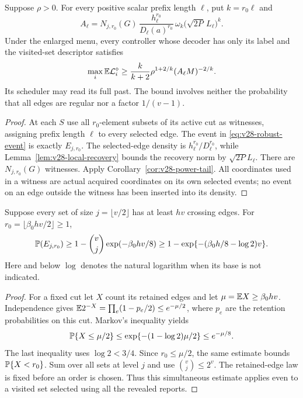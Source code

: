 \begin{proposition}
\label{prop:v28-explicit-tail}
Suppose $\rho>0$. For every positive scalar prefix length $\ell$,
put $k=r_0\ell$ and
\begin{equation}\label{eq:v28-tail-coefficient}
 A_\ell=N_{j,r_0}(G)\,
       \frac{h_\ell^{r_0}}{D_\ell(a)^{r_0}}\,
       \omega_k\bigl(\sqrt{2P}\,L_\ell\bigr)^k.
\end{equation}
Under the enlarged menu, every controller whose decoder has only its
label and the visited-set descriptor satisfies
\begin{equation}\label{eq:v28-explicit-tail}
 \max_i\mathbb E\mathcal L_i^\diamond
       \ge\frac{k}{k+2}\rho^{1+2/k}(A_\ell M)^{-2/k}.
\end{equation}
Its scheduler may read its full past. The bound involves neither the
probability that all edges are regular nor a factor $1/(v-1)$.
\end{proposition}
\begin{proof}
At each $S$ use all $r_0$-element subsets of its active cut as witnesses,
assigning prefix length $\ell$ to every selected edge. The event in
\eqref{eq:v28-robust-event} is exactly $E_{j,r_0}$. The selected-edge
density is $h_\ell^{r_0}/D_\ell^{r_0}$, while
Lemma~\ref{lem:v28-local-recovery} bounds the recovery norm by
$\sqrt{2P}L_\ell$. There are $N_{j,r_0}(G)$ witnesses. Apply
Corollary~\ref{cor:v28-power-tail}. All coordinates used in a witness
are actual acquired coordinates on its own selected events; no event
on an edge outside the witness has been inserted into its density.
\end{proof}

\begin{lemma}\label{lem:v28-retention}
Suppose every set of size $j=\lfloor v/2\rfloor$ has at least $h v$
crossing edges. For $r_0=\lfloor\beta_0 h v/2\rfloor\ge1$,
\begin{equation}\label{eq:v28-retention-probability}
 \mathbb P(E_{j,r_0})\ge
       1-\binom vj\exp(-\beta_0 h v/8)
       \ge1-\exp\{-(\beta_0h/8-\log 2)v\}.
\end{equation}
Here and below $\log$ denotes the natural logarithm when its base is
not indicated.
\end{lemma}
\begin{proof}
For a fixed cut let $X$ count its retained edges and let
$\mu=\mathbb E X\ge\beta_0 h v$. Independence gives
$\mathbb E 2^{-X}=\prod_e(1-p_e/2)\le e^{-\mu/2}$, where $p_e$ are the
retention probabilities on this cut. Markov's inequality yields
\[
 \mathbb P\{X\le\mu/2\}
       \le \exp\{-(1-\log 2)\mu/2\}\le e^{-\mu/8}.
\]
The last inequality uses $\log 2<3/4$. Since $r_0\le\mu/2$,
the same estimate bounds $\mathbb P\{X<r_0\}$. Sum over all sets at
level $j$ and use $\binom vj\le2^v$. The retained-edge law is fixed
before an order is chosen. Thus this simultaneous estimate applies
even to a visited set selected using all the revealed reports.
\end{proof}

